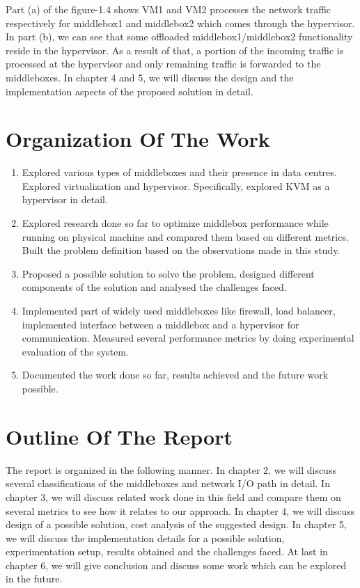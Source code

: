 \documentclass[a4paper,11pt]{report}
\begin{document}
Part (a) of the figure-1.4 shows VM1 and VM2 processes the network traffic respectively for middlebox1 and middlebox2 which comes through the hypervisor. In part (b), we can see that some offloaded middlebox1/middlebox2 functionality reside in the hypervisor. As a result of that, a portion of the incoming traffic is processed at the hypervisor and only remaining traffic is forwarded to the middleboxes. In chapter 4 and 5, we will discuss the design and the implementation aspects of the proposed solution in detail.            


\section{Organization Of The Work}
\begin{enumerate}
\item Explored various types of middleboxes and their presence in data centres. Explored virtualization and hypervisor. Specifically, explored KVM as a hypervisor in detail.
\item Explored research done so far to optimize middlebox performance while running on physical machine and compared them based on different metrics. Built the problem definition based on the observations made in this study.
\item Proposed a possible solution to solve the problem, designed different components of the solution and analysed the challenges faced.        
\item Implemented part of widely used middleboxes like firewall, load balancer, implemented interface between a middlebox and a hypervisor for communication. Measured several performance metrics by doing experimental evaluation of the system.         
\item Documented the work done so far, results achieved and the future work possible.           
\end{enumerate}
\section{Outline Of The Report}
The report is organized in the following manner. In chapter 2, we will discuss several classifications of the middleboxes and network I/O path in detail. In chapter 3, we will discuss related work done in this field and compare them on several metrics to see how it relates to our approach. In chapter 4, we will discuss design of a possible solution, cost analysis of the suggested design. In chapter 5, we will discuss the implementation details for a possible solution, experimentation setup, results obtained and the challenges faced. At last in chapter 6, we will give conclusion and discuss some work which can be explored in the future.     
\end{document}
